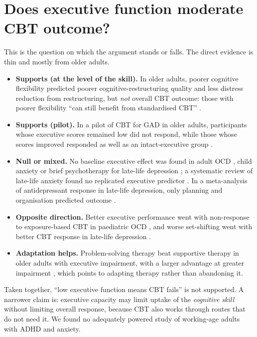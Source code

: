 \section{Does executive function moderate CBT outcome?}\label{sec:moderators}
This is the question on which the argument stands or falls. The direct evidence is thin and mostly from older adults.
\begin{itemize}
\item \textbf{Supports (at the level of the skill).} In older adults, poorer cognitive flexibility predicted poorer cognitive-restructuring quality and less distress reduction from restructuring, but \emph{not} overall CBT outcome: those with poorer flexibility ``can still benefit from standardised CBT'' \citep{johnco2014flex}.
\item \textbf{Supports (pilot).} In a pilot of CBT for GAD in older adults, participants whose executive scores remained low did not respond, while those whose scores improved responded as well as an intact-executive group \citep{mohlman2005ef}.
\item \textbf{Null or mixed.} No baseline executive effect was found in adult OCD \citep{vandborg2016memory}, child anxiety \citep{godovich2020executive} or brief psychotherapy for late-life depression \citep{schurr2025executive}; a systematic review of late-life anxiety found no replicated executive predictor \citep{kyriacou2023predictors}. In a meta-analysis of antidepressant response in late-life depression, only planning and organisation predicted outcome \citep{pimontel2016executive}.
\item \textbf{Opposite direction.} Better executive performance went with non-response to exposure-based CBT in paediatric OCD \citep{hybel2017executive}, and worse set-shifting went with better CBT response in late-life depression \citep{goodkind2016executive}.
\item \textbf{Adaptation helps.} Problem-solving therapy beat supportive therapy in older adults with executive impairment, with a larger advantage at greater impairment \citep{arean2010problem}, which points to adapting therapy rather than abandoning it.
\end{itemize}
Taken together, ``low executive function means CBT fails'' is not supported. A narrower claim is: executive capacity may limit uptake of the \emph{cognitive skill} without limiting overall response, because CBT also works through routes that do not need it. We found no adequately powered study of working-age adults with ADHD and anxiety.

